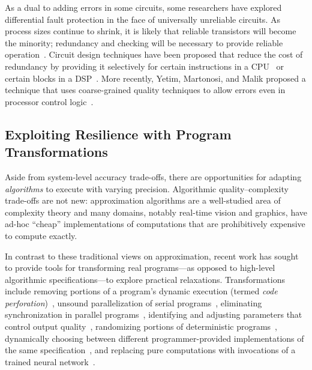 As a dual to adding errors in some circuits, some researchers have
explored differential fault protection in the face of universally unreliable
circuits. As process sizes continue to shrink, it is likely that reliable
transistors will become the minority; redundancy and checking will be
necessary to provide reliable operation~\cite{li-asplos08}. Circuit design
techniques have been proposed that reduce the cost of redundancy by providing
it selectively for certain instructions in a CPU~\cite{wreft} or certain
blocks in a DSP~\cite{unequal-protection, ant}. More recently, Yetim, Martonosi,
and Malik proposed a technique that uses coarse-grained quality techniques to
allow errors even in processor control logic~\cite{martonosi-date}.


\subsection{Exploiting Resilience with Program Transformations}
\label{sec:related:software}

Aside from system-level accuracy trade-offs, there are opportunities for
adapting \emph{algorithms} to execute with varying precision. Algorithmic
quality--complexity trade-offs are not new: approximation algorithms are a
well-studied area of complexity theory and many domains, notably real-time
vision and graphics, have ad-hoc ``cheap'' implementations of computations
that are prohibitively expensive to compute exactly.

In contrast to these
traditional views on approximation, recent work has sought to provide
tools for transforming real programs---as opposed to high-level
algorithmic specifications---to explore practical relaxations.
Transformations include removing portions of a program's dynamic execution
(termed \emph{code perforation})~\cite{perforation-fse}, unsound
parallelization of serial programs~\cite{quickstep}, eliminating
synchronization in parallel programs~\cite{dubstep, races-ibm, hogwild},
identifying and adjusting parameters that control output
quality~\cite{dynamicknobs}, randomizing portions of deterministic
programs~\cite{zhu-popl12, sasa-sas11}, dynamically choosing between
different programmer-provided implementations of the same
specification~\cite{green}, and replacing pure computations with invocations
of a trained neural network~\cite{benchnn, temam-isca}.

